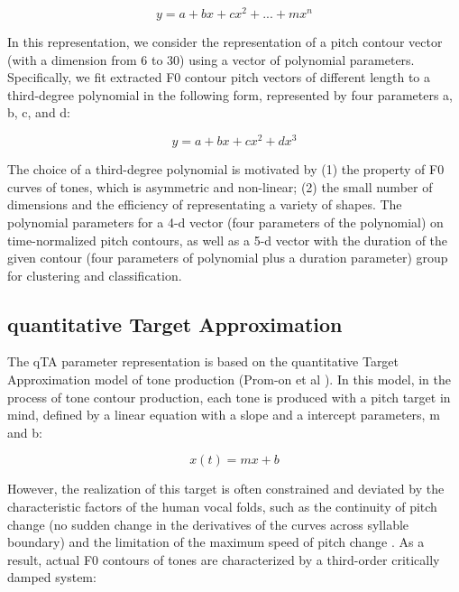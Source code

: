 \documentclass{article}
\begin{document}
\begin{equation}
y=a+bx+cx^2+...+mx^n
\end{equation}

In this representation, we consider the representation of a pitch contour vector (with a dimension from 6 to 30) using a vector of polynomial parameters. Specifically, we fit extracted F0 contour pitch vectors of different length to a third-degree polynomial in the following form, represented by four parameters a, b, c, and d:

\begin{equation}
y=a+bx+cx^2+dx^3
\end{equation}

The choice of a third-degree polynomial is motivated by (1) the property of F0 curves of tones, which is asymmetric and non-linear; (2) the small number of dimensions and the efficiency of representating a variety of shapes. The polynomial parameters for a 4-d vector (four parameters of the polynomial) on time-normalized pitch contours, as well as a 5-d vector with the duration of the given contour (four parameters of polynomial plus a duration parameter) group for clustering and classification.


\subsection{quantitative Target Approximation}
The qTA parameter representation is based on the quantitative Target Approximation model of tone production (Prom-on et al \cite{prom-on:09}). In this model, in the process of tone contour production, each tone is produced with a pitch target in mind, defined by a linear equation with a slope and a intercept parameters, m and b:

\begin{equation}
x(t)=mx+b
\end{equation}

However, the realization of this target is often constrained and deviated by the characteristic factors of the human vocal folds, such as the continuity of pitch change (no sudden change in the derivatives of the curves across syllable boundary) and the limitation of the maximum speed of pitch change \cite{xu:02}. As a result, actual F0 contours of tones are characterized by a third-order critically damped system:
\end{document}
